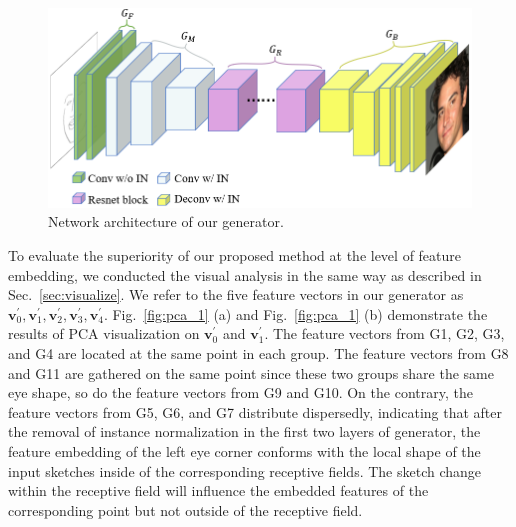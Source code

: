 \documentclass{article}
\newcommand{\dlt}[1]{{}}
\begin{document}
\begin{figure}[htbp]
	\centering
	\includegraphics[width=\columnwidth]{our_model_G.png}
	\caption{Network architecture of our generator. }
	\label{fig:our_generator}
\end{figure}

\dlt{
We use the same three-scale discriminator with pix2pixHD. 
Each discriminator is built on the PatchGAN~\cite{pix2pix} architecture. 
At each scale, the input sketch is concatenated with the corresponding face images, resized and fed into the corresponding discriminator.
}

To evaluate the superiority of our proposed method at the level of feature embedding, we conducted the visual analysis in the same way as described in Sec.~\ref{sec:visualize}.
We refer to the five feature vectors in our generator as $\boldsymbol{v}_0^{'},\boldsymbol{v}_1^{'},\boldsymbol{v}_2^{'},\boldsymbol{v}_3^{'},\boldsymbol{v}_4^{'}$.
%
Fig.~\ref{fig:pca_1} (a) and Fig.~\ref{fig:pca_1} (b) demonstrate the results of PCA visualization on $\boldsymbol{v}_0^{'}$ and $\boldsymbol{v}_1^{'}$. 
The feature vectors from G1, G2, G3, and G4 are located at the same point in each group. The feature vectors from G8 and G11 are gathered on the same point since these two groups share the same eye shape, so do the feature vectors from G9 and G10.
On the contrary, the feature vectors from G5, G6, and G7 distribute dispersedly, indicating that after the removal of instance normalization in the first two layers of generator, the feature embedding of the left eye corner conforms with the local shape of the input sketches inside of the corresponding receptive fields. 
The sketch change within the receptive field will influence the embedded features of the corresponding point but not outside of the receptive field.

\end{document}
